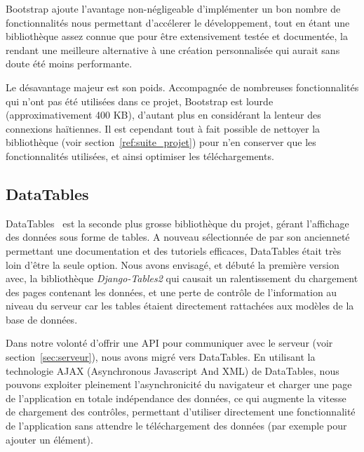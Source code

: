 \documentclass{EPL-master-thesis-covers-FR}
\begin{document}
				Bootstrap ajoute l'avantage non-négligeable d'implémenter un bon nombre de fonctionnalités nous permettant d'accélerer le développement, tout en étant une bibliothèque assez connue que pour être extensivement testée et documentée, la rendant une meilleure alternative à une création personnalisée qui aurait sans doute été moins performante.

				Le désavantage majeur est son poids. Accompagnée de nombreuses fonctionnalités qui n'ont pas été utilisées dans ce projet, Bootstrap est lourde (approximativement 400 KB), d'autant plus en considérant la lenteur des connexions haïtiennes. Il est cependant tout à fait possible de nettoyer la bibliothèque (voir section~\ref{ref:suite_projet}) pour n'en conserver que les fonctionnalités utilisées, et ainsi optimiser les téléchargements.

			\subsection*{DataTables}

				DataTables~\cite{ref:datatables} est la seconde plus grosse bibliothèque du projet, gérant l'affichage des données sous forme de tables. A nouveau sélectionnée de par son ancienneté permettant une documentation et des tutoriels efficaces, DataTables était très loin d'être la seule option. Nous avons envisagé, et débuté la première version avec, la bibliothèque \emph{Django-Tables2} qui causait un ralentissement du chargement des pages contenant les données, et une perte de contrôle de l'information au niveau du serveur car les tables étaient directement rattachées aux modèles de la base de données.

				Dans notre volonté d'offrir une API pour communiquer avec le serveur (voir section~\ref{sec:serveur}), nous avons migré vers DataTables. En utilisant la technologie AJAX (Asynchronous Javascript And XML) de DataTables, nous pouvons exploiter pleinement l'asynchronicité du navigateur et charger une page de l'application en totale indépendance des données, ce qui augmente la vitesse de chargement des contrôles, permettant d'utiliser directement une fonctionnalité de l'application sans attendre le téléchargement des données (par exemple pour ajouter un élément).
\end{document}
